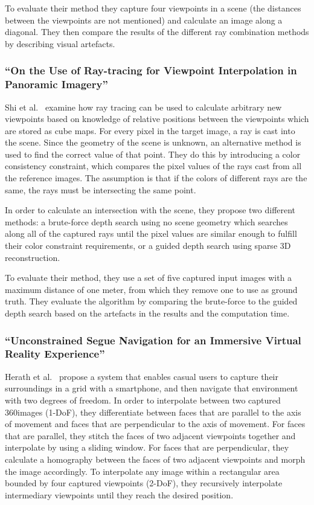 To evaluate their method they capture four viewpoints in a scene (the distances between the viewpoints are not mentioned) and calculate an image along a diagonal. They then compare the results of the different ray combination methods by describing visual artefacts.

\subsubsection{``On the Use of Ray-tracing for Viewpoint Interpolation in Panoramic Imagery'' \cite{raytracing}}
Shi et al.\ \cite{raytracing} examine how ray tracing can be used to calculate arbitrary new viewpoints based on knowledge of relative positions between the viewpoints which are stored as cube maps. For every pixel in the target image, a ray is cast into the scene. Since the geometry of the scene is unknown, an alternative method is used to find the correct value of that point. They do this by introducing a color consistency constraint, which compares the pixel values of the rays cast from all the reference images. The assumption is that if the colors of different rays are the same, the rays must be intersecting the same point.

In order to calculate an intersection with the scene, they propose two different methods: a brute-force depth search using no scene geometry which searches along all of the captured rays until the pixel values are similar enough to fulfill their color constraint requirements, or a guided depth search using sparse 3D reconstruction.

To evaluate their method, they use a set of five captured input images with a maximum distance of one meter, from which they remove one to use as ground truth. They evaluate the algorithm by comparing the brute-force to the guided depth search based on the artefacts in the results and the computation time.

\subsubsection{``Unconstrained Segue Navigation for an Immersive Virtual Reality Experience'' \cite{segue}}
Herath et al.\ \cite{segue} propose a system that enables casual users to capture their surroundings in a grid with a smartphone, and then navigate that environment with two degrees of freedom. In order to interpolate between two captured 360\degree images (1-DoF), they differentiate between faces that are parallel to the axis of movement and faces that are perpendicular to the axis of movement. For faces that are parallel, they stitch the faces of two adjacent viewpoints together and interpolate by using a sliding window. For faces that are perpendicular, they calculate a homography between the faces of two adjacent viewpoints and morph the image accordingly. To interpolate any image within a rectangular area bounded by four captured viewpoints (2-DoF), they recursively interpolate intermediary viewpoints until they reach the desired position.

